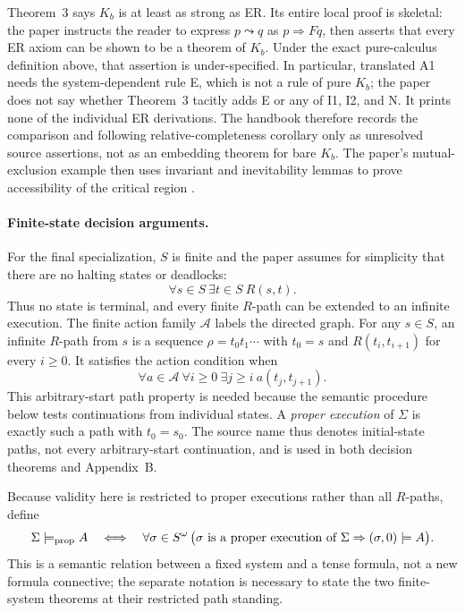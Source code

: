 Theorem~3 says \(K_b\) is at least as strong as ER.  Its entire local proof is
skeletal: the paper instructs the reader to express \(p\leadsto q\) as
\(p\Rightarrow Fq\), then asserts that every ER axiom can be shown to be a
theorem of \(K_b\).  Under the exact pure-calculus definition above, that
assertion is under-specified.  In particular, translated A1 needs the
system-dependent rule E, which is not a rule of pure \(K_b\); the paper does
not say whether Theorem~3 tacitly adds E or any of I1, I2, and N.  It prints
none of the individual ER derivations.  The handbook therefore records the
comparison and following relative-completeness corollary only as unresolved
source assertions, not as an embedding theorem for bare \(K_b\).  The paper's
mutual-exclusion example then uses invariant and inevitability lemmas to prove
accessibility of the critical region
\cite[pp.~53--55]{Pnueli1977}.

\paragraph{Finite-state decision arguments.}
For the final specialization, \(S\) is finite and the paper assumes for
simplicity that there are no halting states or deadlocks:
\[
 \forall s\in S\ \exists t\in S\ R(s,t).
\]
Thus no state is terminal, and every finite \(R\)-path can be extended to an
infinite execution.  The finite action family \(\mathcal A\) labels the
directed graph.  For any \(s\in S\), an infinite \(R\)-path from \(s\) is a
sequence \(\rho=t_0t_1\cdots\) with \(t_0=s\) and
\(R(t_i,t_{i+1})\) for every \(i\ge0\).  It satisfies the action condition when
\[
 \forall a\in\mathcal A\ \forall i\ge0\
 \exists j\ge i\ a(t_j,t_{j+1}).
\]
This arbitrary-start path property is needed because the semantic procedure
below tests continuations from individual states.  A \emph{proper execution}
of \(\Sigma\) is exactly such a path with \(t_0=s_0\).  The source name thus
denotes initial-state paths, not every arbitrary-start continuation, and is
used in both decision theorems and Appendix~B.

Because validity here is restricted to proper executions rather than all
\(R\)-paths, define
\[
 \Sigma\models_{\rm prop}A
 \quad\Longleftrightarrow\quad
 \forall\sigma\in S^\omega\,
 \bigl(\sigma\text{ is a proper execution of }\Sigma
       \Rightarrow(\sigma,0)\models A\bigr).
\]
This is a semantic relation between a fixed system and a tense formula, not a
new formula connective; the separate notation is necessary to state the two
finite-system theorems at their restricted path standing.

